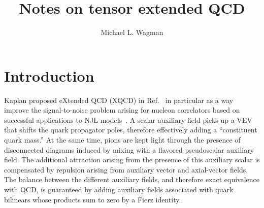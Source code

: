 \documentclass[%
    twocolumn,
superscriptaddress,
preprintnumbers,
nofootinbib,
 amsmath,amssymb,
 aps,
 prd,
 floatfix,
]{revtex4-2}
\begin{document}

\title{Notes on tensor extended QCD}

 \author{Michael L. Wagman}





\maketitle


\section{Introduction}
\label{sec:intro}

Kaplan proposed eXtended QCD (XQCD) in Ref.~\cite{Kaplan:2013dca} in particular as a way improve the signal-to-noise problem arising for nucleon correlators based on successful applications to NJL models~\cite{Grabowska:2012ik,Nicholson:2012xt}.
A scalar auxiliary field picks up a VEV that shifts the quark propagator poles, therefore effectively adding a ``constituent quark mass.''
At the same time, pions are kept light through the presence of disconnected diagrams induced by mixing with a flavored pseudoscalar auxiliary field.
The additional attraction arising from the presence of this auxiliary scalar is compensated by repulsion arising from auxiliary vector and axial-vector fields.
The balance between the different auxiliary fields, and therefore exact equivalence with QCD, is guaranteed by adding auxiliary fields associated with quark bilinears whose products sum to zero by a Fierz identity.
\end{document}
